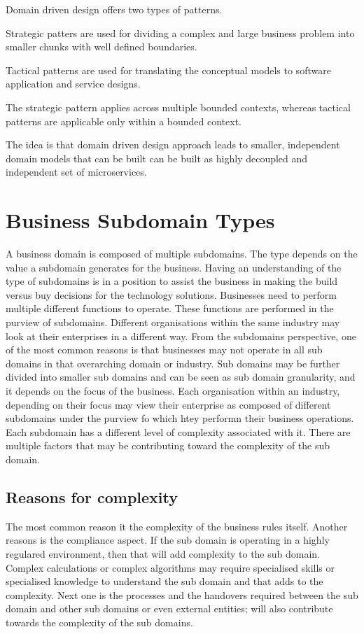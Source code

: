 Domain driven design offers two types of patterns.

Strategic patters are used for dividing a complex and large business problem into smaller chunks with well defined boundaries.

Tactical patterns are used for translating the conceptual models to software application and service designs.

The strategic pattern applies across multiple bounded contexts, whereas tactical patterns are applicable only within a bounded context.

The idea is that domain driven design approach leads to smaller, independent domain models that can be built can be built as highly decoupled and independent set of microservices.

\section{Business Subdomain Types}
A business domain is composed of multiple subdomains.
The type depends on the value a subdomain generates for the business.
Having an understanding of the type of subdomains is in a position to assist the business in making the build versus buy decisions for the technology solutions.
Businesses need to perform multiple different functions to operate.
These functions are performed in the purview of subdomains.
Different organisations within the same industry may look at their enterprises in a different way.
From the subdomains perspective, one of the most common reasons is that businesses may not operate in all sub domains in that overarching domain or industry.
Sub domains may be further divided into smaller sub domains and can be seen as sub domain granularity, and it depends on the focus of the business.
Each organisation within an industry, depending on their focus may view their enterprise as composed of different subdomains under the purview fo which htey performn their business operations.
Each subdomain has a different level of complexity associated with it.
There are multiple factors that may be contributing toward the complexity of the sub domain.

\subsection{Reasons for complexity}
The most common reason it the complexity of the business rules itself.
Another reasons is the compliance aspect.
If the sub domain is operating in a highly regulared environment, then that will add complexity to the sub domain.
Complex calculations or complex algorithms may require specialised skills or specialised knowledge to understand the sub domain and that adds to the complexity.
Next one is the processes and the handovers required between the sub domain and other sub domains or even external entities; will also contribute towards the complexity of the sub domains.

